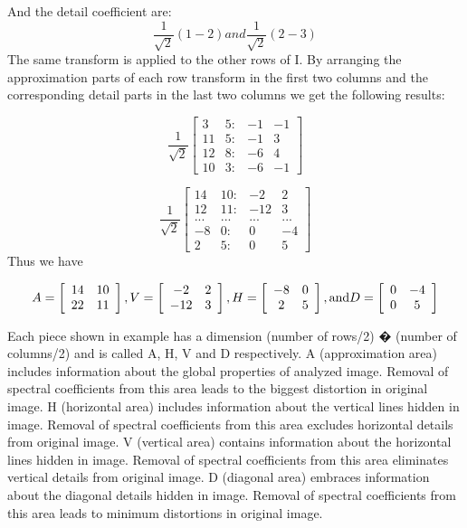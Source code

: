 And the detail coefficient are: 
\[ \frac{1}{\sqrt{2}}\left( 1 - 2\right) and \frac{1}{\sqrt{2}}\left( 2 - 3\right)\]
The same transform is applied to the other rows of I. By arranging the approximation parts of each row transform in the first two columns and the corresponding detail parts in the last two columns we get the following results: 


\[
  \frac{1}{\sqrt{2}}
  \left[ {\begin{array}{cccc}
  3 & 5: & -1 & -1\\
  11 & 5: & -1 & 3\\
  12 & 8: & -6 & 4\\
  10 & 3: & -6 & -1
  \end{array} } \right]
\]


\[
  \frac{1}{\sqrt{2}}
  \left[ {\begin{array}{cccc}
  14 & 10: & -2 & 2\\
  12 & 11: & -12 & 3\\
  ... & ... & ... & ...\\
  -8 & 0: & 0 & -4\\
  2 & 5: & 0 & 5
  \end{array} } \right]
\]
Thus we have

\[
  A=
  \left[ {\begin{array}{cc}
  14 & 10 \\
  22 & 11
\end{array} } \right],  V=
  \left[ {\begin{array}{cc}
  -2 & 2 \\
  -12 & 3
\end{array} } \right],  H=
  \left[ {\begin{array}{cc}
  -8 & 0 \\
  2 & 5
\end{array} } \right], \text{and}\\  D=
  \left[ {\begin{array}{cc}
  0 & -4 \\
  0 & 5
\end{array} } \right]
\]


Each piece shown in example has a dimension (number of rows/2) � (number of columns/2) and is called A, H, V and D respectively. A (approximation area) includes information about the global properties of analyzed image. Removal of spectral coefficients from this area leads to the biggest distortion in original image. H (horizontal area) includes information about the vertical lines hidden in image. Removal of spectral coefficients from this area excludes horizontal details from original image. V (vertical area) contains information about the horizontal lines hidden in image. Removal of spectral coefficients from this area eliminates vertical details from original image. D (diagonal area) embraces information about the diagonal details hidden in image. Removal of spectral coefficients from this area leads to minimum distortions in original image. 




